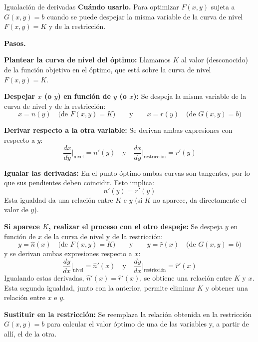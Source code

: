 \documentclass{article}
\newcommand{\rotulo}[2][principal]{\textsf{\bfseries\color{#1}#2}\enspace}
\begin{document}
\begin{metodo}[label=met:igualacion]{Igualación de derivadas}
\rotulo{Cuándo usarlo.} Para optimizar \(F(x,y)\) sujeta a \(G(x,y)=b\) cuando se puede despejar la misma variable de la curva de nivel \(F(x,y)=K\) y de la restricción.
 
\rotulo{Pasos.}
\begin{pasos}
    \item \textbf{Plantear la curva de nivel del óptimo:}
    Llamamos \(K\) al valor (desconocido) de la función objetivo en el óptimo, que está sobre la curva de nivel \(F(x,y)=K\).
 
    \item \textbf{Despejar \(x\) (o \(y\)) en función de \(y\) (o \(x\)):}
    Se despeja la misma variable de la curva de nivel y de la restricción:
    \[
    x = n(y) \quad \text{(de } F(x,y)=K\text{)} \qquad \text{y} \qquad x = r(y) \quad \text{(de } G(x,y)=b\text{)}
    \]
 
    \item \textbf{Derivar respecto a la otra variable:}
    Se derivan ambas expresiones con respecto a \(y\):
    \[
    \frac{dx}{dy}\Big|_{\text{nivel}} = n'(y) \quad \text{y} \quad \frac{dx}{dy}\Big|_{\text{restricción}} = r'(y)
    \]
 
    \item \textbf{Igualar las derivadas:}
    En el punto óptimo ambas curvas son tangentes, por lo que sus pendientes deben coincidir. Esto implica:
    \[
    n'(y)=r'(y)
    \]
    Esta igualdad da una relación entre \(K\) e \(y\) (si \(K\) no aparece, da directamente el valor de \(y\)).
 
    \item \textbf{Si aparece \(K\), realizar el proceso con el otro despeje:}
    Se despeja \(y\) en función de \(x\) de la curva de nivel y de la restricción:
    \[
    y = \hat{n}(x) \quad \text{(de } F(x,y)=K\text{)} \qquad \text{y} \qquad y = \hat{r}(x) \quad \text{(de } G(x,y)=b\text{)}
    \]
    y se derivan ambas expresiones respecto a \(x\):
    \[
    \frac{dy}{dx}\Big|_{\text{nivel}} = \hat{n}'(x) \quad \text{y} \quad \frac{dy}{dx}\Big|_{\text{restricción}} = \hat{r}'(x)
    \]
    Igualando estas derivadas, \(\hat{n}'(x)=\hat{r}'(x)\), se obtiene una relación entre \(K\) y \(x\). Esta segunda igualdad, junto con la anterior, permite eliminar \(K\) y obtener una relación entre \(x\) e \(y\).
 
    \item \textbf{Sustituir en la restricción:}
    Se reemplaza la relación obtenida en la restricción \(G(x,y)=b\) para calcular el valor óptimo de una de las variables y, a partir de allí, el de la otra.
\end{pasos}
 

\end{metodo}
\end{document}
